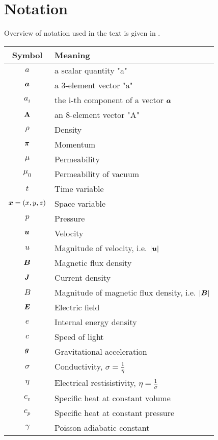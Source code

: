 \section{Notation}
Overview of notation used in the text is given in .
\begin{table}[H]
    \centering
    \begin{tabular}{ |c|l| } 
        \hline
        Symbol & Meaning \\ 
        \hline
        $a$ & a scalar quantity "a"\\
        $\mbox{\boldmath $a$}$ & a 3-element vector "a"\\
        $a_i$ & the i-th component of a vector $\mbox{\boldmath $a$}$ \\
        $\mathrm{\mathbf{A}}$ & an 8-element vector "A" \\
        \hline
        $\rho$ & Density \\ 
        $\mbox{\boldmath $\pi$}$ & Momentum \\ 
        $\mu$ & Permeability \\ 
        $\mu_0$ & Permeability of vacuum\\ 
        $t$ & Time variable\\ 
        $\mbox{\boldmath $x$} = \left( x, y, z\right)$ & Space variable \\ 
        $p$ & Pressure \\ 
        $\mbox{\boldmath $u$}$ & Velocity \\ 
        $u$ & Magnitude of velocity, i.e. $|\mbox{\boldmath $u$}|$ \\ 
        $\mbox{\boldmath $B$}$ & Magnetic flux density \\ 
        $\mbox{\boldmath $J$}$ & Current density\\ 
        $B$ & Magnitude of magnetic flux density, i.e. $|\mbox{\boldmath $B$}|$ \\ 
        $\mbox{\boldmath $E$}$ & Electric field\\ 
        $e$ & Internal energy density \\ 
        $c$ & Speed of light\\ 
        $\mbox{\boldmath $g$}$ & Gravitational acceleration\\ 
        $\sigma$ & Conductivity, $\sigma = \frac{1}{\eta}$\\ 
        $\eta$ & Electrical restisistivity, $\eta = \frac{1}{\sigma}$\\
        $c_v$ & Specific heat at constant volume\\
        $c_p$ & Specific heat at constant pressure\\
        $\gamma$ & Poisson adiabatic constant\\

\end{tabular}
\end{table}
